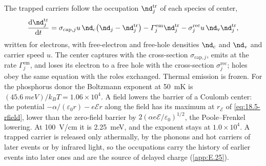 The trapped carriers follow the occupation $\nd^{\mathrm{tr}}_j$ of each species of center,
\begin{equation}
  \frac{\dd\nd^{\mathrm{tr}}_j}{\dd t} = \sigma_{\mathrm{cap},j}u\,\nd_{\mathrm{c}}\bigl(\nd_j - \nd^{\mathrm{tr}}_j\bigr) - \varGamma^{\mathrm{em}}_j\nd^{\mathrm{tr}}_j - \sigma^{\mathrm{rec}}_ju\,\nd_{\mathrm{v}}\nd^{\mathrm{tr}}_j ,
  \label{eq:18.5-traps}
\end{equation}
written for electrons, with free-electron and free-hole densities $\nd_{\mathrm{c}}$ and $\nd_{\mathrm{v}}$ and carrier speed $u$. The center captures with the cross-section $\sigma_{\mathrm{cap},j}$, emits at the rate $\varGamma^{\mathrm{em}}_j$, and loses its electron to a free hole with the cross-section $\sigma^{\mathrm{rec}}_j$; holes obey the same equation with the roles exchanged. Thermal emission is frozen. For the phosphorus donor the Boltzmann exponent at \SI{50}{mK} is $(\SI{45.6}{meV})/k_BT = 1.06\times10^4$. A field lowers the barrier of a Coulomb center: the potential $-\alpha/(\varepsilon_0r) - e\mathcal{E}r$ along the field has its maximum at $r_{\mathcal{E}}$ of \cref{eq:18.5-rfield}, lower than the zero-field barrier by $2(\alpha e\mathcal{E}/\varepsilon_0)^{1/2}$, the Poole--Frenkel lowering. At \SI{100}{V/cm} it is \SI{2.25}{meV}, and the exponent stays at $1.0\times10^4$. A trapped carrier is released only athermally, by the phonons and hot carriers of later events or by infrared light, so the occupations carry the history of earlier events into later ones and are the source of delayed charge (\cref{app:E.25}).

